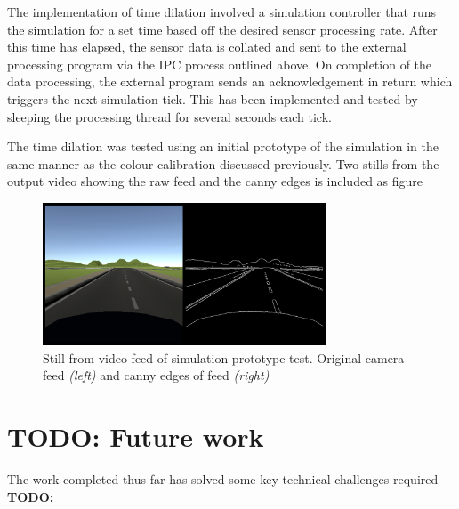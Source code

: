 \documentclass[]{aiaa-tc}%
\begin{document}
The implementation of time dilation involved a simulation controller that runs the simulation for a set time based off the desired sensor processing rate. After this time has elapsed, the sensor data is collated and sent to the external processing program via the IPC process outlined above. On completion of the data processing, the external program sends an acknowledgement in return which triggers the next simulation tick. This has been implemented and tested by sleeping the processing thread for several seconds each tick.

The time dilation was tested using an initial prototype of the simulation in the same manner as the colour calibration discussed previously. Two stills from the output video showing the raw feed and the canny edges is included as figure 

\begin{figure} %
	\centering
	\includegraphics[width=0.75\textwidth, height=0.75\textwidth]{simPrototypeIPC.png}
	\caption{Still from video feed of simulation prototype test. Original camera feed \textit{(left)} and canny edges of feed \textit{(right)}}
	\label{f:simPrototypeIPCTest}
\end{figure}

\section{TODO: Future work}

The work completed thus far has solved some key technical challenges required \textbf{TODO: }
\end{document}
